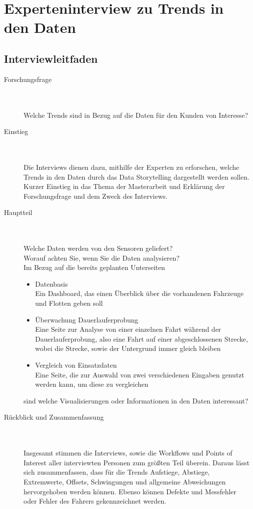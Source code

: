 \chapter{Experteninterview zu Trends in den Daten}
\section{Interviewleitfaden}
\label{appendix:interview_trends}
\begin{description}
\item[Forschungsfrage]\hfill \\\\
Welche Trends sind in Bezug auf die Daten für den Kunden von Interesse?\\
\item[Einstieg]\hfill \\\\
Die Interviews dienen dazu, mithilfe der Experten zu erforschen, welche Trends in den Daten durch das Data Storytelling dargestellt werden sollen.
Kurzer Einstieg in das Thema der Masterarbeit und Erklärung der Forschungsfrage und dem Zweck des Interviews.\\
\item[Hauptteil]\hfill \\\\
Welche Daten werden von den Sensoren geliefert?\\
Worauf achten Sie, wenn Sie die Daten analysieren?\\
Im Bezug auf die bereits geplanten Unterseiten\\
\begin{itemize}
    \item Datenbasis\hfill \\Ein Dashboard, das einen Überblick über die vorhandenen Fahrzeuge und Flotten geben soll
    \item Überwachung Dauerlauferprobung\hfill \\Eine Seite zur Analyse von einer einzelnen Fahrt während der Dauerlauferprobung, also eine Fahrt auf einer abgeschlossenen Strecke, wobei die Strecke, sowie der Untergrund immer gleich bleiben
    \item Vergleich von Einsatzdaten\hfill \\Eine Seite, die zur Auswahl von zwei verschiedenen Eingaben genutzt werden kann, um diese zu vergleichen\\
\end{itemize}
sind welche Visualisierungen oder Informationen in den Daten interessant?\\
\item[Rückblick und Zusammenfassung]\hfill \\\\
Insgesamt stimmen die Interviews, sowie die Workflows und Points of Interest aller interviewten Personen zum größten Teil überein. Daraus lässt sich zusammenfassen, dass für die Trends Aufstiege, Abstiege, Extremwerte, Offsets, Schwingungen und allgemeine Abweichungen hervorgehoben werden können. Ebenso können Defekte und Messfehler oder Fehler des Fahrers gekennzeichnet werden.

\end{description}